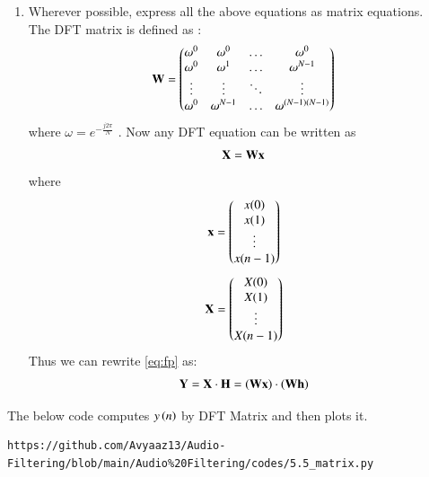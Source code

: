 \documentclass[journal,12pt,twocolumn]{IEEEtran}
\theoremstyle{remark}
\renewcommand\thesection{\arabic{section}}
\numberwithin{equation}{subsection}
\begin{document}
\begin{enumerate}[label=\thesection.\arabic*]
\item Wherever possible, express all the above equations as matrix equations.\\
\solution The DFT matrix is defined as : 
\begin{align}
	\mathbf{W} = 
	\begin{pmatrix}
		\omega^0 & \omega^0 & \ldots & \omega^0 \\
		\omega^0 & \omega^1 & \ldots & \omega^{N - 1} \\
		\vdots & \vdots & \ddots & \vdots \\
		\omega^0 & \omega^{N - 1} & \ldots & \omega^{(N -1)(N - 1)}
	\end{pmatrix}
\end{align}
where $\omega=e^{-\frac{j2\pi}{N}}$ . Now any DFT equation can be written as
\begin{align}
    \mathbf{X} = \mathbf{W}\mathbf{x}
\end{align}
\noindent where
\begin{align}
	\mathbf{x} = 
	\begin{pmatrix}
		x(0) \\ x(1) \\ \vdots \\ x(n - 1)
	\end{pmatrix}
\end{align}
\begin{align}
	\mathbf{X} = 
	\begin{pmatrix}
		X(0) \\ X(1) \\ \vdots \\ X(n - 1)
	\end{pmatrix}
\end{align}
Thus we can rewrite  \eqref{eq:fp} as:
\begin{align}
	\mathbf{Y} = \mathbf{X}\cdot\mathbf{H} = \left(\mathbf{W}\mathbf{x}\right)\cdot\left(\mathbf{W}\mathbf{h}\right)
\end{align}
\end{enumerate}
The below code computes $y\left(n\right)$ by DFT Matrix and then plots it.
\begin{lstlisting}
https://github.com/Avyaaz13/Audio-Filtering/blob/main/Audio%20Filtering/codes/5.5_matrix.py
\end{lstlisting}
\end{document}
